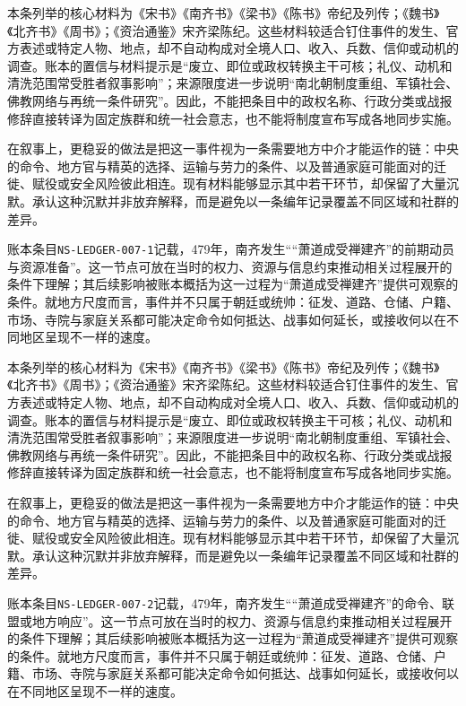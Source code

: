 本条列举的核心材料为《宋书》《南齐书》《梁书》《陈书》帝纪及列传；《魏书》《北齐书》《周书》；《资治通鉴》宋齐梁陈纪。这些材料较适合钉住事件的发生、官方表述或特定人物、地点，却不自动构成对全境人口、收入、兵数、信仰或动机的调查。账本的置信与材料提示是“废立、即位或政权转换主干可核；礼仪、动机和清洗范围常受胜者叙事影响”；来源限度进一步说明“南北朝制度重组、军镇社会、佛教网络与再统一条件研究”。因此，不能把条目中的政权名称、行政分类或战报修辞直接转译为固定族群和统一社会意志，也不能将制度宣布写成各地同步实施。

在叙事上，更稳妥的做法是把这一事件视为一条需要地方中介才能运作的链：中央的命令、地方官与精英的选择、运输与劳力的条件、以及普通家庭可能面对的迁徙、赋役或安全风险彼此相连。现有材料能够显示其中若干环节，却保留了大量沉默。承认这种沉默并非放弃解释，而是避免以一条编年记录覆盖不同区域和社群的差异。

账本条目\texttt{NS-LEDGER-007-1}记载，479年，南齐发生““萧道成受禅建齐”的前期动员与资源准备”。这一节点可放在当时的权力、资源与信息约束推动相关过程展开的条件下理解；其后续影响被账本概括为这一过程为“萧道成受禅建齐”提供可观察的条件。就地方尺度而言，事件并不只属于朝廷或统帅：征发、道路、仓储、户籍、市场、寺院与家庭关系都可能决定命令如何抵达、战事如何延长，或接收何以在不同地区呈现不一样的速度。

本条列举的核心材料为《宋书》《南齐书》《梁书》《陈书》帝纪及列传；《魏书》《北齐书》《周书》；《资治通鉴》宋齐梁陈纪。这些材料较适合钉住事件的发生、官方表述或特定人物、地点，却不自动构成对全境人口、收入、兵数、信仰或动机的调查。账本的置信与材料提示是“废立、即位或政权转换主干可核；礼仪、动机和清洗范围常受胜者叙事影响”；来源限度进一步说明“南北朝制度重组、军镇社会、佛教网络与再统一条件研究”。因此，不能把条目中的政权名称、行政分类或战报修辞直接转译为固定族群和统一社会意志，也不能将制度宣布写成各地同步实施。

在叙事上，更稳妥的做法是把这一事件视为一条需要地方中介才能运作的链：中央的命令、地方官与精英的选择、运输与劳力的条件、以及普通家庭可能面对的迁徙、赋役或安全风险彼此相连。现有材料能够显示其中若干环节，却保留了大量沉默。承认这种沉默并非放弃解释，而是避免以一条编年记录覆盖不同区域和社群的差异。

账本条目\texttt{NS-LEDGER-007-2}记载，479年，南齐发生““萧道成受禅建齐”的命令、联盟或地方响应”。这一节点可放在当时的权力、资源与信息约束推动相关过程展开的条件下理解；其后续影响被账本概括为这一过程为“萧道成受禅建齐”提供可观察的条件。就地方尺度而言，事件并不只属于朝廷或统帅：征发、道路、仓储、户籍、市场、寺院与家庭关系都可能决定命令如何抵达、战事如何延长，或接收何以在不同地区呈现不一样的速度。

